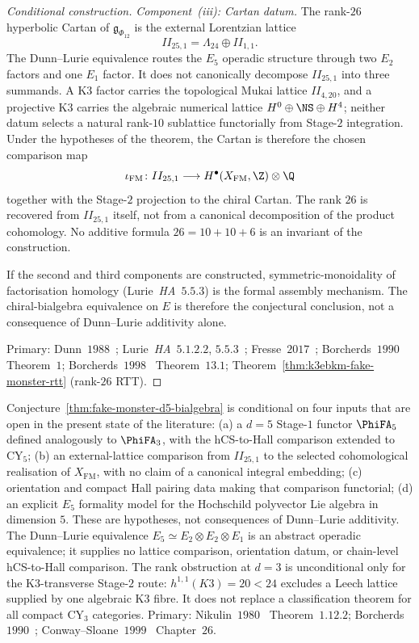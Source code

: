 \begin{proof}[Conditional construction]
\emph{Component~(iii): Cartan datum.}
The rank-$26$ hyperbolic Cartan of $\mathfrak{g}_{\Phi_{12}}$ is the external Lorentzian lattice
\[
 II_{25,1}=\Lambda_{24}\oplus II_{1,1}.
\]
The Dunn--Lurie equivalence routes the $E_5$ operadic structure through two $E_2$ factors and one $E_1$ factor. It does not canonically decompose $II_{25,1}$ into three summands. A K3 factor carries the topological Mukai lattice $II_{4,20}$, and a projective K3 carries the algebraic numerical lattice $H^0\oplus\NS\oplus H^4$; neither datum selects a natural rank-$10$ sublattice functorially from Stage-$2$ integration. Under the hypotheses of the theorem, the Cartan is therefore the chosen comparison map
\[
 \iota_{\mathrm{FM}}\colon II_{25,1}\longrightarrow H^\bullet(X_{\mathrm{FM}},\Z)\otimes\Q
\]
together with the Stage-$2$ projection to the chiral Cartan. The rank $26$ is recovered from $II_{25,1}$ itself, not from a canonical decomposition of the product cohomology. No additive formula $26=10+10+6$ is an invariant of the construction.

If the second and third components are constructed, symmetric-monoidality
of factorisation homology (Lurie~\textit{HA}~$5.5.3$) is the formal
assembly mechanism. The chiral-bialgebra equivalence on \(E\) is
therefore the conjectural conclusion, not a consequence of
Dunn--Lurie additivity alone.

Primary: Dunn~$1988$~\cite{Dunn1988}; Lurie~\textit{HA}~$5.1.2.2$, $5.5.3$~\cite{LurieHA}; Fresse~$2017$~\cite{Fresse2017}; Borcherds~$1990$~\cite{Borcherds1990Adv} Theorem~$1$; Borcherds~$1998$~\cite{Borcherds1998} Theorem~$13.1$; Theorem~\ref{thm:k3ebkm-fake-monster-rtt} (rank-$26$ RTT).
\end{proof}

\begin{remark}[Scope boundary of the $d = 5$ Fake Monster placement]
\label{rem:fake-monster-d5-scope}
Conjecture~\ref{thm:fake-monster-d5-bialgebra} is conditional on four inputs that are open in the present state of the literature: (a) a $d=5$ Stage-$1$ functor $\PhiFA_5$ defined analogously to $\PhiFA_3$, with the hCS-to-Hall comparison extended to CY$_5$; (b) an external-lattice comparison from \(II_{25,1}\) to the selected cohomological realisation of \(X_{\mathrm{FM}}\), with no claim of a canonical integral embedding; (c) orientation and compact Hall pairing data making that comparison functorial; (d) an explicit $E_5$ formality model for the Hochschild polyvector Lie algebra in dimension $5$. These are hypotheses, not consequences of Dunn--Lurie additivity. The Dunn--Lurie equivalence $E_5\simeq E_2\otimes E_2\otimes E_1$ is an abstract operadic equivalence; it supplies no lattice comparison, orientation datum, or chain-level hCS-to-Hall comparison. The rank obstruction at $d=3$ is unconditional only for the K3-transverse Stage-$2$ route: $h^{1,1}(K3)=20<24$ excludes a Leech lattice supplied by one algebraic K3 fibre. It does not replace a classification theorem for all compact CY$_3$ categories. Primary: Nikulin~$1980$~\cite{Nikulin1980} Theorem~$1.12.2$; Borcherds~$1990$~\cite{Borcherds1990Adv}; Conway--Sloane~$1999$~\cite{ConwaySloane1988} Chapter~$26$.
\end{remark}

